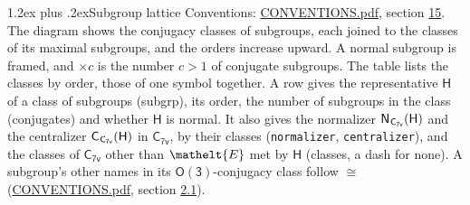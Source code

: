 \documentclass[10pt,a4paper]{article}
\makeatletter
\renewcommand\section{\@startsection{section}{1}{\z@}{-3ex plus -1ex minus -.2ex}%
  {1.2ex plus .2ex}{\normalfont\large\sffamily\bfseries\color{parttitle}}}
\numberwithin{equation}{section}
\newcommand{\eltfont}[1]{{\let\sigma\eltsigma\mathelt{#1}}}
\newcommand{\grp}[1]{\mathsf{#1}}
\newcommand{\cls}[1]{\eltfont{#1}}
\newcommand{\samecls}{\cong}
\newcommand{\nconj}[1]{{\scriptsize$\times#1$}}
\newcommand{\hairsp}{\mkern1mu}
\makeatother
\begin{document}
\section{Subgroup lattice}\label{s:subgroups}
Conventions: \href{../../CONVENTIONS.pdf}{CONVENTIONS.pdf}, section \href{../../CONVENTIONS.pdf\#conv.15}{15}.
The diagram shows the conjugacy classes of subgroups, each joined to the classes of its maximal subgroups, and the orders increase upward. A normal subgroup is framed, and ${\times}c$ is the number $c > 1$ of conjugate subgroups. The table lists the classes by order, those of one symbol together. \label{n:group.H}\label{n:head.subgroup}\label{n:head.order}\label{n:head.conjugates}\label{n:head.normal}A row gives the representative $\grp{H}$ of a class of subgroups (subgrp), its order, the number of subgroups in the class (conjugates) and whether $\grp{H}$ is normal. \label{n:group.normalizer}\label{n:group.centralizer}\label{n:head.classes}It also gives the normalizer $\grp{N}_{\hairsp \grp{C_{7v}}}(\grp{H})$ and the centralizer $\grp{C}_{\hairsp \grp{C_{7v}}}(\grp{H})$ in $\grp{C_{7v}}$, by their classes (\texttt{normalizer}, \texttt{centralizer}), and the classes of $\grp{C_{7v}}$ other than $\cls{E}$ met by $\grp{H}$ (classes, a dash for none). A subgroup's other names in its \href{O3.pdf}{$\grp{O(3)}$}-conjugacy class follow $\samecls$ (\href{../../CONVENTIONS.pdf}{CONVENTIONS.pdf}, section \href{../../CONVENTIONS.pdf\#conv.2.1}{2.1}).
\begin{center}
\end{center}
\end{document}
